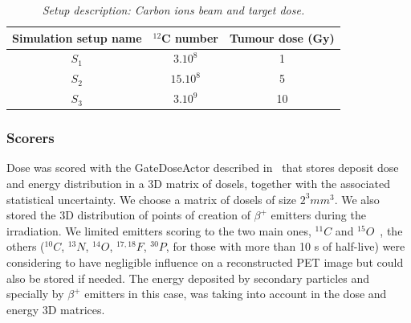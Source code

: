 \documentclass[11pt]{iopart}
\begin{document}
\begin{table}[htbp]
\begin{center}
\begin{tabular}{|c|c|c|} \hline
Simulation setup name  & $^{12}$C number  & Tumour dose (Gy)       \\\hline \hline

$S_{1}$    & $3.10^{8}$             & 1                                          \\ \hline
$S_{2}$    & $15.10^{8}$                  & 5                                          \\ \hline
$S_{3}$    & $3.10^{9}$                 & 10                                      \\ \hline \hline 

\end{tabular}
\end{center} 
\caption{\it Setup description: Carbon ions beam and target dose.}
\label{tab:setup}
\end{table}







\subsubsection{Scorers}

Dose was scored with the GateDoseActor described
in~\cite{Jan2011,Sarrut2008} that stores deposit dose and energy
distribution in a 3D matrix of dosels, together with the associated
statistical uncertainty. We choose a matrix of dosels of size $2^3
mm^3$.  We also stored the 3D distribution of points of creation of
$\beta^+$ emitters during the irradiation. We limited emitters scoring
to the two main ones, $^{11}C$ and $^{15}O$~\cite{Pshenichnov2007},
the others ($^{10}C$, $^{13}N$, $^{14}O$, $^{17,18}F$, $^{30}P$, for
those with more than 10 s of half-live) were considering to have
negligible influence on a reconstructed PET image but could also be
stored if needed. The energy deposited by secondary particles and
specially by $\beta^+$ emitters in this case, was taking into account
in the dose and energy 3D matrices.
\end{document}
